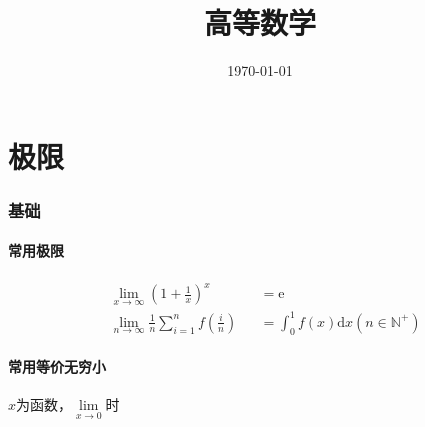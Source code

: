 \documentclass{article}
\title{高等数学}
\author{}
\date{\today}
\begin{document}
\hypersetup{hidelinks,
    allcolors = black,
    breaklinks = true
}

\newtheorem{definition}{Definition}[subsection]
\newtheorem{theorem}{Theorem}[subsection]
\newtheorem{corollary}{Corollary}[theorem]
\renewcommand{\proofname}{\indent\bf Proof}

\def\e{\mathrm e}
\def\i{\mathrm i}
\def\d{\mathrm d}
\def\C{\mathrm C}
\def\div{\mathrm{div}}
\def\rot{\mathrm{rot}}
\def\vecv{\vec{\mathrm v}}
\def\sr{\mathbb R}
\def\sn{\mathbb N}
\def\snp{\mathbb N^+}
\def\sc{\mathbb C}

\newcommand{\abs}[1]{\left|#1\right|}
\newcommand{\pare}[1]{\left(#1\right)}
\newcommand{\jacobi}[2]{\frac{\partial\pare{#1}}{\partial\pare{#2}}}

\begin{titlepage}
    \maketitle
\end{titlepage}

\tableofcontents
\newpage

\part{极限}

\section{基础}

\subsection{常用极限}

\[\begin{aligned}
         & \lim_{x\to\infty}{\pare{1+\frac1x}^x}                  &  & =\e                                  \\
         & \lim_{n\to\infty}{\frac1n\sum_{i=1}^nf\pare{\frac in}} &  & =\int_0^1f\pare x\d x\pare{n\in\snp}
    \end{aligned}\]

\subsection{常用等价无穷小}

$x$为函数，$\lim\limits_{x\to0}$时
\end{document}
